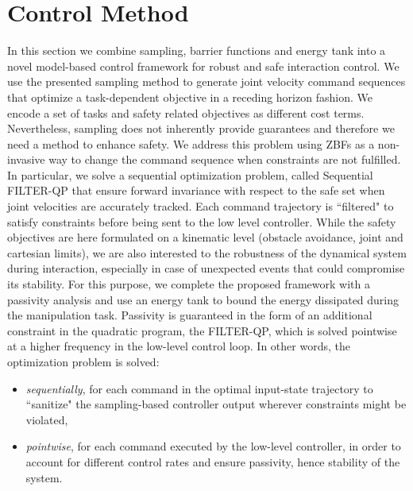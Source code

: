 \section{Control Method} \label{sec:control_method}

In this section we combine sampling, barrier functions and energy tank into a novel model-based control framework for robust and safe interaction control. We use the presented sampling method to generate joint velocity command sequences that optimize a task-dependent objective in a receding horizon fashion. We encode a set of tasks and safety related objectives as different cost terms. Nevertheless, sampling does not inherently provide guarantees and therefore we need a method to enhance safety. We address this problem using ZBFs as a non-invasive way to change the command sequence when constraints are not fulfilled. In particular, we solve a sequential optimization problem, called Sequential FILTER-QP that ensure forward invariance with respect to the safe set when joint velocities are accurately tracked. Each command trajectory is ``filtered" to satisfy constraints before being sent to the low level controller. While the safety objectives are here formulated on a kinematic level (obstacle avoidance, joint and cartesian limits), we are also interested to the robustness of the dynamical system during interaction, especially in case of unexpected events that could compromise its stability. For this purpose, we complete the proposed framework with a passivity analysis and use an energy tank to bound the energy dissipated during the manipulation task. Passivity is guaranteed in the form of an additional constraint in the quadratic program, the FILTER-QP, which is solved pointwise at a higher frequency in the low-level control loop. In other words, the optimization problem is solved:
\begin{itemize}
    \item \textit{sequentially}, for each command in the optimal input-state trajectory to ``sanitize" the sampling-based controller output wherever constraints might be violated,
    \item \textit{pointwise}, for each command executed by the low-level controller, in order to account for different control rates and ensure passivity, hence stability of the system.
\end{itemize}

